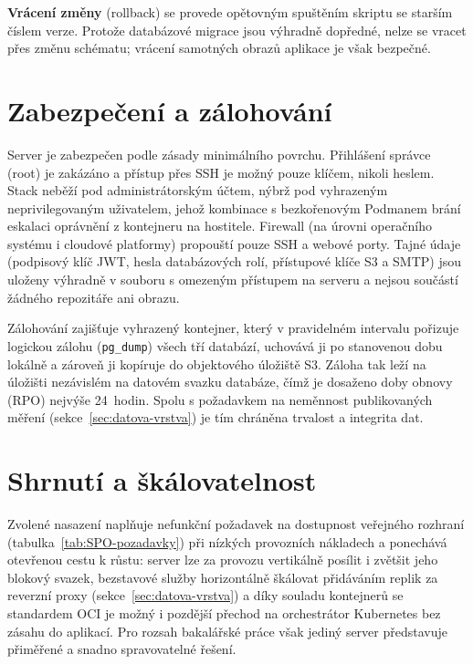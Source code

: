 \textbf{Vrácení změny} (rollback) se provede opětovným spuštěním skriptu se starším číslem verze. Protože databázové migrace jsou výhradně dopředné, nelze se vracet přes změnu schématu; vrácení samotných obrazů aplikace je však bezpečné.

\section{Zabezpečení a zálohování}
\label{sec:nasazeni-bezpecnost}

Server je zabezpečen podle zásady minimálního povrchu. Přihlášení správce (root) je zakázáno a přístup přes SSH je možný pouze klíčem, nikoli heslem. Stack neběží pod administrátorským účtem, nýbrž pod vyhrazeným neprivilegovaným uživatelem, jehož kombinace s bezkořenovým Podmanem brání eskalaci oprávnění z kontejneru na hostitele. Firewall (na úrovni operačního systému i cloudové platformy) propouští pouze SSH a webové porty. Tajné údaje (podpisový klíč JWT, hesla databázových rolí, přístupové klíče S3 a SMTP) jsou uloženy výhradně v souboru s omezeným přístupem na serveru a nejsou součástí žádného repozitáře ani obrazu.

Zálohování zajišťuje vyhrazený kontejner, který v pravidelném intervalu pořizuje logickou zálohu (\texttt{pg\_dump}) všech tří databází, uchovává ji po stanovenou dobu lokálně a zároveň ji kopíruje do objektového úložiště S3. Záloha tak leží na úložišti nezávislém na datovém svazku databáze, čímž je dosaženo doby obnovy (RPO) nejvýše 24~hodin. Spolu s požadavkem na neměnnost publikovaných měření (sekce~\ref{sec:datova-vrstva}) je tím chráněna trvalost a integrita dat.

\section{Shrnutí a škálovatelnost}
\label{sec:nasazeni-shrnuti}

Zvolené nasazení naplňuje nefunkční požadavek na dostupnost veřejného rozhraní (tabulka~\ref{tab:SPO-pozadavky}) při nízkých provozních nákladech a ponechává otevřenou cestu k růstu: server lze za provozu vertikálně posílit i zvětšit jeho blokový svazek, bezstavové služby horizontálně škálovat přidáváním replik za reverzní proxy (sekce~\ref{sec:datova-vrstva}) a díky souladu kontejnerů se standardem OCI je možný i pozdější přechod na orchestrátor Kubernetes bez zásahu do aplikací. Pro rozsah bakalářské práce však jediný server představuje přiměřené a snadno spravovatelné řešení.
